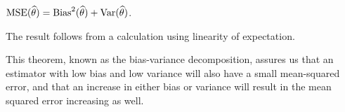 \begin{thm}\label{BiasVarianceDecomp}$\index{Estimator!variance of}\text{MSE}(\widehat{\theta}) = \text{Bias}^2(\widehat{\theta}) + \Var(\widehat{\theta})$.
\end{thm}
\begin{pf} The result follows from a calculation using linearity of expectation.
\end{pf}
\par
This theorem, known as the bias-variance decomposition, assures us that an estimator with low bias and low variance will also have a small mean-squared error, and that an increase in either bias or variance will result in the mean squared error increasing as well.

